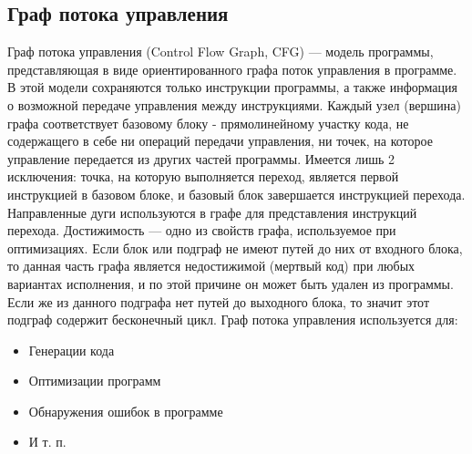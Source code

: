 \subsection{Граф потока управления} \label{ch1:subsec-title-abbr}
Граф потока управления (Control Flow Graph, CFG) — модель программы, представляющая в виде ориентированного графа поток управления в программе. В этой модели сохраняются только инструкции программы, а также информация о возможной передаче управления между инструкциями.
Каждый узел (вершина) графа соответствует базовому блоку - прямолинейному участку кода, не содержащего в себе ни операций передачи управления, ни точек, на которое управление передается из других частей программы. Имеется лишь 2 исключения: точка, на которую выполняется переход, является первой инструкцией в базовом блоке, и базовый блок завершается инструкцией перехода. Направленные дуги используются в графе для представления инструкций перехода. Достижимость — одно из свойств графа, используемое при оптимизациях. Если блок или подграф не имеют путей до них от входного блока, то данная часть графа является недостижимой (мертвый код) при любых вариантах исполнения, и по этой причине он может быть удален из программы. Если же из данного подграфа нет путей до выходного блока, то значит этот подграф содержит бесконечный цикл.
Граф потока управления используется для:
\begin{itemize}
\item Генерации кода 
\item Оптимизации программ 
\item Обнаружения ошибок в программе 
\item И т. п.
\end{itemize}

